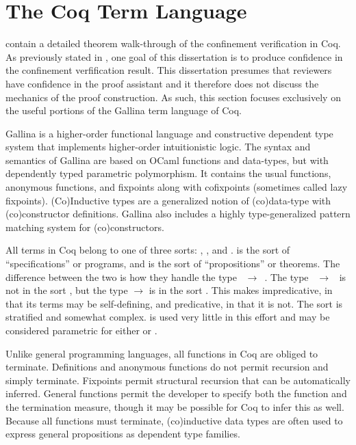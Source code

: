 \section{The Coq Term Language}

 contain a detailed theorem walk-through of the confinement verification in Coq.
As previously stated in , one goal of this dissertation is to produce confidence in the confinement verfification result.
This dissertation presumes that reviewers have confidence in the proof assistant and it therefore does not discuss the mechanics of the proof construction.
As such, this section focuses exclusively on the useful portions of the Gallina term language of Coq.

Gallina is a higher-order functional language and constructive dependent type system that implements higher-order intuitionistic logic.
The syntax and semantics of Gallina are based on OCaml functions and data-types, but with dependently typed parametric polymorphism.
It contains the usual functions, anonymous functions, and fixpoints along with cofixpoints (sometimes called lazy fixpoints).
(Co)Inductive types are a generalized notion of (co)data-type with (co)constructor definitions.
Gallina also includes a highly type-generalized pattern matching system for (co)constructors.

All terms in Coq belong to one of three sorts: , , and .
 is the sort of ``specifications'' or programs, and  is the sort of ``propositions'' or theorems.
The difference between the two is how they handle the type \mbox{\coqvar{*} \(\rightarrow\) \coqvar{*}}.
The type \mbox{ \(\rightarrow\) } is not in the sort , but the type  \(\rightarrow\)  is in the sort .
This makes  impredicative, in that its terms may be self-defining, and  predicative, in that it is not.
The sort  is stratified and somewhat complex.
 is used very little in this effort and may be considered parametric for either  or .

Unlike general programming languages, all functions in Coq are obliged to terminate.
Definitions and anonymous functions do not permit recursion and simply terminate.
Fixpoints permit structural recursion that can be automatically inferred.
General functions permit the developer to specify both the function and the termination measure, though it may be possible for Coq to infer this as well.
Because all functions must terminate, (co)inductive data types are often used to express general propositions as dependent type families.

